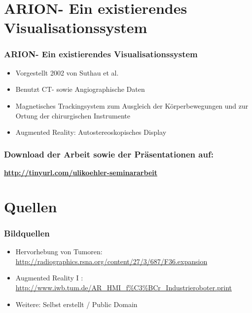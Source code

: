\documentclass[14pt]{beamer}
\begin{document}
\section{ARION\texttrademark - Ein existierendes Visualisationssystem}
\begin{frame}
\frametitle{ARION\texttrademark - Ein existierendes Visualisationssystem}
\begin{itemize}
\item Vorgestellt 2002 von Suthau et al.
\item Benutzt CT- sowie Angiographische Daten
\item Magnetisches Trackingsystem zum Ausgleich der Körperbewegungen und zur Ortung der chirurgischen Instrumente
\item Augmented Reality: Autostereoskopisches Display
\end{itemize}
\end{frame}

\begin{frame}
 \frametitle{Download der Arbeit sowie der Präsentationen auf:}
 \begin{center}
   \textbf{\url{http://tinyurl.com/ulikoehler-seminararbeit}}
 \end{center}
\end{frame}

%
%
\section{Quellen}
\begin{frame}[shrink]
 \frametitle{Bildquellen}
 \begin{itemize}
  \item Hervorhebung von Tumoren:\\ \url{http://radiographics.rsna.org/content/27/3/687/F36.expansion}
  \item Augmented Reality I :\\ \url{http://www.iwb.tum.de/AR_HMI_f\%C3\%BCr_Industrieroboter.print}
  \item Weitere: Selbst erstellt / Public Domain
 \end{itemize}
 
\end{frame}
\end{document}
